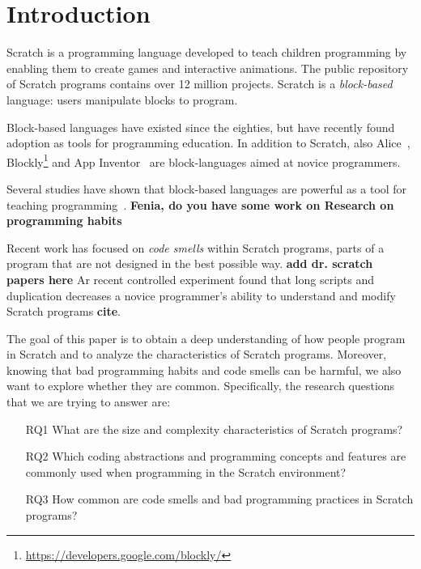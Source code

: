 \documentclass{sig-alternate}
\newcommand{\todo}[1]{\textbf{#1}}
\begin{document}



\section{Introduction}

Scratch is a programming language developed to teach children programming by enabling them to create games and interactive animations. The public repository of Scratch programs contains over 12 million projects. Scratch is a \emph{block-based} language: users manipulate blocks to program.

Block-based languages have existed since the eighties, but have recently found adoption as tools for programming education. In addition to Scratch, also Alice~\cite{conway_alice:_1994}, Blockly\footnote{\url{https://developers.google.com/blockly/}} and App Inventor~\cite{wolber_app_2011} are block-languages aimed at novice programmers.

Several studies have shown that block-based languages are powerful as a tool for teaching programming~\cite{meerbaum-salant_learning_2010, b._moskal_evaluating_2005,cooper_teaching_2003}. \todo{Fenia, do you have some work on Research on programming habits}

Recent work has focused on \emph{code smells} within Scratch programs, parts of a program that are not designed in the best possible way. \todo{add dr. scratch papers here} Ar recent controlled experiment found that long scripts and duplication decreases a novice programmer's ability to understand and modify Scratch programs \todo{cite}.

The goal of this paper is to obtain a deep understanding of how people program in Scratch and to analyze the characteristics of Scratch programs. Moreover, knowing that bad programming habits and code smells can be harmful, we also want to explore whether they are common. Specifically, the research questions that we are trying to answer are:

\begin{itemize}
\item[RQ1] What are the size and complexity characteristics of Scratch programs?
\item[RQ2] Which coding abstractions and programming concepts and features are commonly used when programming in the Scratch environment?
\item[RQ3] How common are code smells and bad programming practices in Scratch programs?
\end{itemize}
\end{document}
